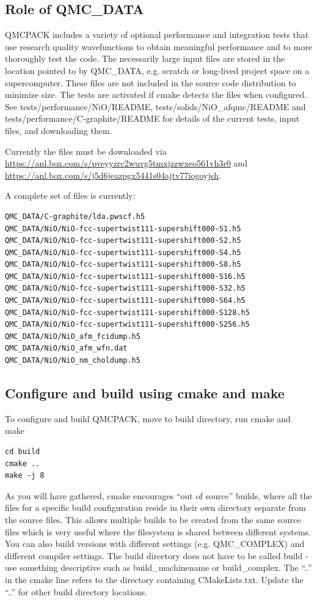 \subsection{Role of QMC\_DATA}
QMCPACK includes a variety of optional performance and integration
tests that use research quality wavefunctions to obtain meaningful
performance and to more thoroughly test the code. The necessarily
large input files are stored in the location pointed to by QMC\_DATA,
e.g. scratch or long-lived project space on a supercomputer. These
files are not included in the source code distribution to minimize
size. The tests are activated if cmake detects the files when
configured. See tests/performance/NiO/README,
tests/solids/NiO\_afqmc/README and tests/performance/C-graphite/README
for details of the current tests, input files, and downloading them.

Currently the files must be downloaded via\\
\url{https://anl.box.com/s/pveyyzrc2wuvg5tmxjzzwxeo561vh3r0} and \\
\url{https://anl.box.com/s/j5d6jeazpgx5441s04ajtv77iogoyjsh}.

A complete set of files is currently:
\verbatimfont{\footnotesize}%
\begin{verbatim}
QMC_DATA/C-graphite/lda.pwscf.h5
QMC_DATA/NiO/NiO-fcc-supertwist111-supershift000-S1.h5
QMC_DATA/NiO/NiO-fcc-supertwist111-supershift000-S2.h5
QMC_DATA/NiO/NiO-fcc-supertwist111-supershift000-S4.h5
QMC_DATA/NiO/NiO-fcc-supertwist111-supershift000-S8.h5
QMC_DATA/NiO/NiO-fcc-supertwist111-supershift000-S16.h5
QMC_DATA/NiO/NiO-fcc-supertwist111-supershift000-S32.h5
QMC_DATA/NiO/NiO-fcc-supertwist111-supershift000-S64.h5
QMC_DATA/NiO/NiO-fcc-supertwist111-supershift000-S128.h5
QMC_DATA/NiO/NiO-fcc-supertwist111-supershift000-S256.h5
QMC_DATA/NiO/NiO_afm_fcidump.h5
QMC_DATA/NiO/NiO_afm_wfn.dat
QMC_DATA/NiO/NiO_nm_choldump.h5
\end{verbatim}


\subsection{Configure and build using cmake and make}
To configure and build QMCPACK, move to build directory, run cmake and make
\verbatimfont{\footnotesize}
\begin{verbatim}
cd build
cmake ..
make -j 8
\end{verbatim}

As you will have gathered, cmake encourages ``out of source'' builds,
where all the files for a specific build configuration reside in their
own directory separate from the source files. This allows multiple
builds to be created from the same source files which is very useful
where the filesystem is shared between different systems. You can also
build versions with different settings (e.g. QMC\_COMPLEX) and
different compiler settings. The build directory does not have to be
called build - use something descriptive such as build\_machinename or
build\_complex. The ``..'' in the cmake line refers to the directory
containing CMakeLists.txt. Update the ``..'' for other build
directory locations.

